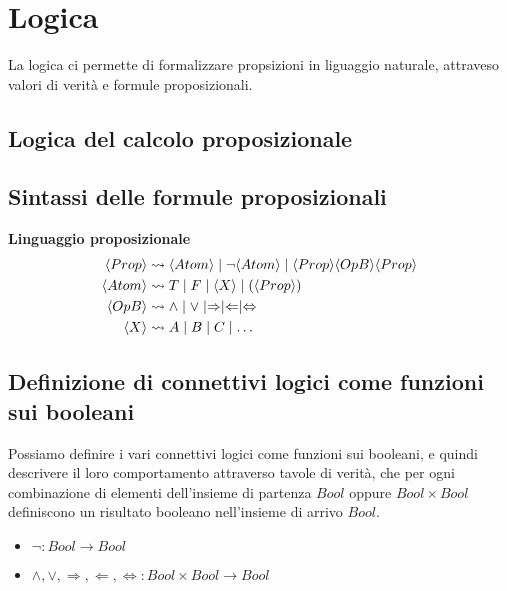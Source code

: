 \documentclass{article}
\begin{document}
\pagebreak

\section{Logica}
La logica ci permette di formalizzare propsizioni in liguaggio naturale, attraveso valori di verità e formule proposizionali.

\subsection{Logica del calcolo proposizionale}
\subsection*{Sintassi delle formule proposizionali}
\begin{center}
    \textbf{Linguaggio proposizionale}
    \begin{align*}
        \langle Prop \rangle & \leadsto \langle Atom \rangle \mid \lnot\langle Atom \rangle \mid \langle Prop \rangle\langle OpB \rangle\langle Prop \rangle \\
        \langle Atom \rangle & \leadsto T \mid F \mid \langle X \rangle \mid (\langle Prop \rangle)                                     \\
        \langle OpB \rangle  & \leadsto \land \mid \lor \mid \Rightarrow \mid \Leftarrow \mid \Leftrightarrow             \\
        \langle X \rangle    & \leadsto A \mid B \mid C \mid \ldots
    \end{align*}
\end{center}
\subsection*{Definizione di connettivi logici come funzioni sui booleani}
Possiamo definire i vari connettivi logici come funzioni sui booleani, e quindi descrivere il loro comportamento attraverso tavole di verità, che per ogni combinazione di elementi dell'insieme di partenza \(Bool\) oppure \(Bool \times Bool\) definiscono un risultato booleano nell'insieme di arrivo \(Bool\).
\begin{itemize}
    \item \(\lnot: Bool \rightarrow Bool\)
    \item \(\land, \lor, \Rightarrow, \Leftarrow, \Leftrightarrow: Bool \times Bool \rightarrow Bool\)
\end{itemize}
\end{document}
